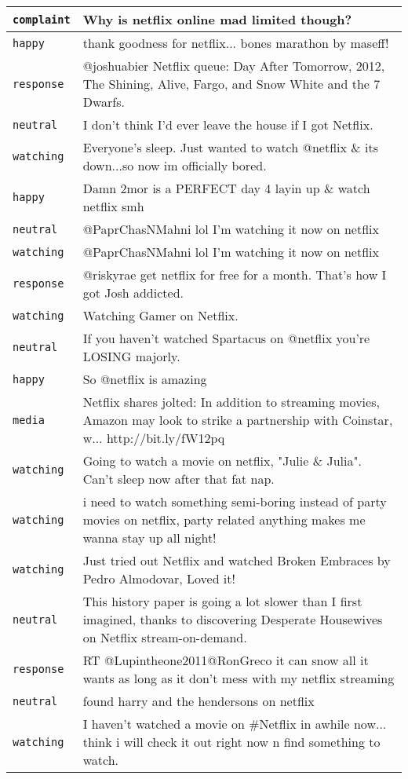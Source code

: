 \begin{center}
\begin{longtable}{|l|p{120mm}|}
      \tabularnewline\hline
         \texttt{complaint} & Why is netflix online mad limited though?
      \tabularnewline\hline
         \texttt{happy} & thank goodness for netflix... bones marathon by maseff!
      \tabularnewline\hline
         \texttt{response} & @joshuabier Netflix queue: Day After Tomorrow, 2012, The Shining, Alive, Fargo, and Snow White and the 7 Dwarfs.
      \tabularnewline\hline
         \texttt{neutral} & I don't think I'd ever leave the house if I got Netflix.
      \tabularnewline\hline
         \texttt{watching} & Everyone's sleep. Just wanted to watch @netflix \& its down...so now im officially bored.
      \tabularnewline\hline
         \texttt{happy} & Damn 2mor is a PERFECT day 4 layin up \& watch netflix smh
      \tabularnewline\hline
         \texttt{neutral} & @PaprChasNMahni lol I'm watching it now on netflix
      \tabularnewline\hline
         \texttt{watching} & @PaprChasNMahni lol I'm watching it now on netflix
      \tabularnewline\hline
         \texttt{response} & @riskyrae get netflix for free for a month. That's how I got Josh addicted.
      \tabularnewline\hline
         \texttt{watching} & Watching Gamer on Netflix.
      \tabularnewline\hline
         \texttt{neutral} & If you haven't watched Spartacus on @netflix you're LOSING majorly.
      \tabularnewline\hline
         \texttt{happy} & So @netflix is amazing
      \tabularnewline\hline
         \texttt{media} & Netflix shares jolted: In addition to streaming movies, Amazon may look to strike a partnership with Coinstar, w... http://bit.ly/fW12pq
      \tabularnewline\hline
         \texttt{watching} & Going to watch a movie on netflix, "Julie \& Julia". Can't sleep now after that fat nap.
      \tabularnewline\hline
         \texttt{watching} & i need to watch something semi-boring instead of party movies on netflix, party related anything makes me wanna stay up all night!
      \tabularnewline\hline
         \texttt{watching} & Just tried out Netflix and watched Broken Embraces by Pedro Almodovar, Loved it!
      \tabularnewline\hline
         \texttt{neutral} & This history paper is going a lot slower than I first imagined, thanks to discovering Desperate Housewives on Netflix stream-on-demand.
      \tabularnewline\hline
         \texttt{response} & RT @Lupintheone2011@RonGreco it can snow all it wants as long as it don't mess with my netflix streaming
      \tabularnewline\hline
         \texttt{neutral} & found harry and the hendersons on netflix
      \tabularnewline\hline
         \texttt{watching} & I haven't watched a movie on \#Netflix in awhile now... think i will check it out right now n find something to watch.

\end{longtable}
\end{center}
